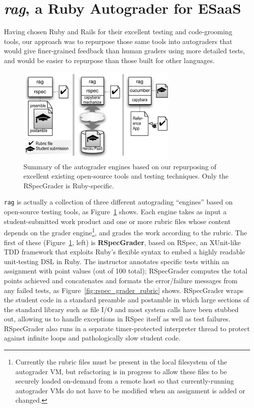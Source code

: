 \section{\emph{rag}, a Ruby Autograder for ESaaS}

Having chosen Ruby and Rails for their excellent testing and
code-grooming tools, our approach was to repurpose those same tools into
autograders that would give finer-grained feedback than human graders
using more detailed tests, and would be easier to repurpose than
those built for other languages.

\begin{figure}
  \centering
  \includegraphics[width=0.7\textwidth]{figs/rag.pdf}
  
  \caption{\label{fig:grader_summary} Summary of the autograder
    engines based on our repurposing of excellent existing open-source
    tools and testing techniques.  Only the RSpecGrader is
    Ruby-specific.}
\end{figure}

\texttt{rag} is actually a collection of
three different autograding ``engines'' based on open-source testing
tools, as Figure~\ref{fig:grader_summary} shows.
Each engine takes as input a student-submitted work product and one or
more rubric files whose content depends on the grader
engine\footnote{Currently the rubric files must be present in the local
filesystem of the autograder VM, but refactoring is in progress to
allow these files to be securely loaded on-demand from a remote host
so that currently-running autograder VMs do not have to be modified
when an assignment is added or changed.}, and grades the work
according to the rubric.
The first of these (Figure~\ref{fig:grader_summary}, left) is
\textbf{RSpecGrader}, based on RSpec, an XUnit-like TDD framework that
exploits Ruby's flexible syntax to embed a highly readable unit-testing
DSL in Ruby.
The instructor annotates specific tests within an assignment with point
values (out of 100 total); RSpecGrader computes the total points
achieved and concatenates and formats the error/failure messages from
any failed tests, as Figure~\ref{fig:rspec_grader_rubric} shows.
RSpecGrader wraps the student code in a standard preamble and postamble
in which large sections of the standard library such as file I/O and
most system calls have been stubbed out, allowing us to handle
exceptions in RSpec itself as well as test failures.
RSpecGrader also runs in a separate timer-protected interpreter thread
to protect against infinite loops and pathologically slow student code.

